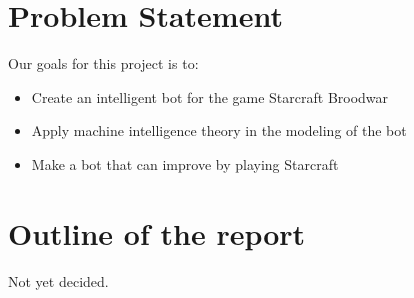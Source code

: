 \section{Problem Statement}
	Our goals for this project is to:
	\begin{itemize}
		\item Create an intelligent bot for the game Starcraft Broodwar
		\item Apply machine intelligence theory in the modeling of the bot
		\item Make a bot that can improve by playing Starcraft
		
	\end{itemize}

\section{Outline of the report}
	Not yet decided.